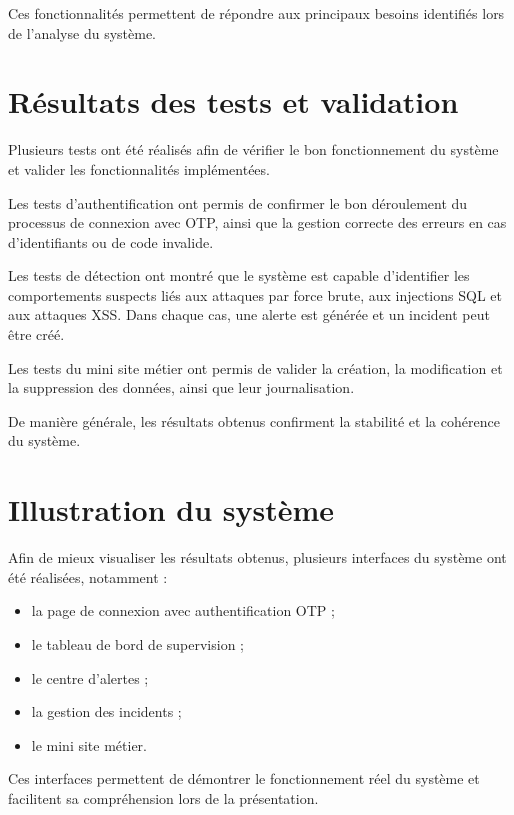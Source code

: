\documentclass[a4paper,12pt]{report}
\begin{document}
    Ces fonctionnalités permettent de répondre aux principaux besoins identifiés lors de l’analyse du système.
    
    \section{Résultats des tests et validation}
    
    Plusieurs tests ont été réalisés afin de vérifier le bon fonctionnement du système et valider les fonctionnalités implémentées.
    
    Les tests d’authentification ont permis de confirmer le bon déroulement du processus de connexion avec OTP, ainsi que la gestion correcte des erreurs en cas d’identifiants ou de code invalide.
    
    Les tests de détection ont montré que le système est capable d’identifier les comportements suspects liés aux attaques par force brute, aux injections SQL et aux attaques XSS. Dans chaque cas, une alerte est générée et un incident peut être créé.
    
    Les tests du mini site métier ont permis de valider la création, la modification et la suppression des données, ainsi que leur journalisation.
    
    De manière générale, les résultats obtenus confirment la stabilité et la cohérence du système.
    
    \section{Illustration du système}
    
    Afin de mieux visualiser les résultats obtenus, plusieurs interfaces du système ont été réalisées, notamment :
    
    \begin{itemize}
        \item la page de connexion avec authentification OTP ;
        \item le tableau de bord de supervision ;
        \item le centre d’alertes ;
        \item la gestion des incidents ;
        \item le mini site métier.
    \end{itemize}
    
    Ces interfaces permettent de démontrer le fonctionnement réel du système et facilitent sa compréhension lors de la présentation.
    
\end{document}
